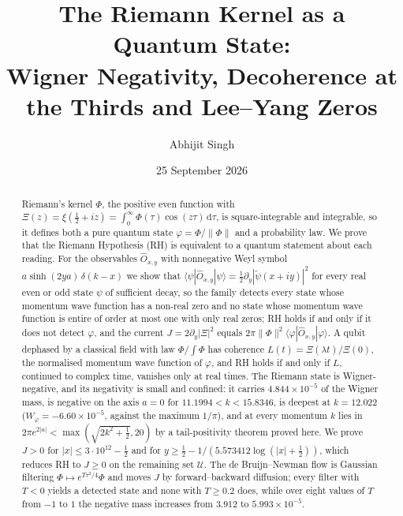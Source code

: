 \documentclass[11pt]{article}
\title{\textbf{The Riemann Kernel as a Quantum State:}\\[2pt]\textbf{Wigner Negativity, Decoherence at the Thirds and Lee--Yang Zeros}}
\author{Abhijit Singh}
\date{25 September 2026}
\theoremstyle{definition}\newtheorem{definition}[theorem]{Definition}
\theoremstyle{remark}\newtheorem{remark}[theorem]{Remark}
\newcommand{\dd}{\,\mathrm d}\newcommand{\e}{\mathrm e}
\begin{document}
\maketitle
\begin{abstract}
Riemann's kernel $\Phi$, the positive even function with $\Xi(z)=\xi(\frac12+iz)=\int_0^\infty\Phi(\tau)\cos(z\tau)\dd\tau$, is square-integrable and integrable, so it defines both a pure quantum state $\varphi=\Phi/\|\Phi\|$ and a probability law. We prove that the Riemann Hypothesis (RH) is equivalent to a quantum statement about each reading. For the observables $\hat O_{x,y}$ with nonnegative Weyl symbol $a\sinh(2ya)\,\delta(k-x)$ we show that $\langle\psi|\hat O_{x,y}|\psi\rangle=\frac12\partial_y|\tilde\psi(x+iy)|^2$ for every real even or odd state $\psi$ of sufficient decay, so the family detects every state whose momentum wave function has a non-real zero and no state whose momentum wave function is entire of order at most one with only real zeros; RH holds if and only if it does not detect $\varphi$, and the current $J=2\partial_y|\Xi|^2$ equals $2\pi\|\Phi\|^2\langle\varphi|\hat O_{x,y}|\varphi\rangle$. A qubit dephased by a classical field with law $\Phi/\int\Phi$ has coherence $L(t)=\Xi(\lambda t)/\Xi(0)$, the normalised momentum wave function of $\varphi$, and RH holds if and only if $L$, continued to complex time, vanishes only at real times. The Riemann state is Wigner-negative, and its negativity is small and confined: it carries $4.844\times10^{-5}$ of the Wigner mass, is negative on the axis $a=0$ for $11.1994<k<15.8346$, is deepest at $k=12.022$ ($W_\varphi=-6.60\times10^{-5}$, against the maximum $1/\pi$), and at every momentum $k$ lies in $2\pi e^{2|a|}<\max(\sqrt{2k^2+\frac12},20)$ by a tail-positivity theorem proved here. We prove $J>0$ for $|x|\le3\cdot10^{12}-\frac12$ and for $y\ge\frac12-1/(5.573412\log(|x|+\frac12))$, which reduces RH to $J\ge0$ on the remaining set $\mathcal U$. The de Bruijn--Newman flow is Gaussian filtering $\Phi\mapsto e^{T\tau^2/4}\Phi$ and moves $J$ by forward--backward diffusion; every filter with $T<0$ yields a detected state and none with $T\ge0.2$ does, while over eight values of $T$ from $-1$ to $1$ the negative mass increases from $3.912$ to $5.993\times10^{-5}$.


\end{abstract}
\end{document}
